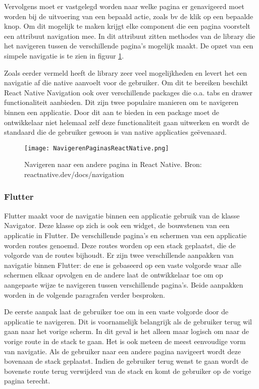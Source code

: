 Vervolgens moet er vastgelegd worden naar welke pagina er genavigeerd moet worden bij de uitvoering van een bepaald actie, zoals bv de klik op een bepaalde knop. Om dit mogelijk te maken krijgt elke component die een pagina voorstelt een attribuut navigation mee. In dit attribuut zitten methodes van de library die het navigeren tussen de verschillende pagina's mogelijk maakt. De opzet van een simpele navigatie is te zien in figuur \ref{fig:navigerenReactNative}. 

Zoals eerder vermeld heeft de library zeer veel mogelijkheden en levert het een navigatie af die native aanvoelt voor de gebruiker. Om dit te bereiken beschikt React Native Navigation ook over verschillende packages die o.a. tabs en drawer functionaliteit aanbieden. Dit zijn twee populaire manieren om te navigeren binnen een applicatie. Door dit aan te bieden in een package moet de ontwikkelaar niet helemaal zelf deze functionaliteit gaan uitwerken en wordt de standaard die de gebruiker gewoon is van native applicaties geëvenaard.

\begin{figure}
    \texttt{[image: NavigerenPaginasReactNative.png]}
    \caption{Navigeren naar een andere pagina in React Native. Bron: reactnative.dev/docs/navigation}
    \label{fig:navigerenReactNative}
\end{figure}

\subsubsection{Flutter}
\label{subsubsec:navigatieFlutter}

Flutter maakt voor de navigatie binnen een applicatie gebruik van de klasse Navigator. Deze klasse op zich is ook een widget, de bouwstenen van een applicatie in Flutter. De verschillende pagina's en schermen van een applicatie worden routes genoemd. Deze routes worden op een stack geplaatst, die de volgorde van de routes bijhoudt. Er zijn twee verschillende aanpakken van navigatie binnen Flutter: de ene is gebaseerd op een vaste volgorde waar alle schermen elkaar opvolgen en de andere laat de ontwikkelaar toe om op aangepaste wijze te navigeren tussen verschillende pagina's. Beide aanpakken worden in de volgende paragrafen verder besproken. 

De eerste aanpak laat de gebruiker toe om in een vaste volgorde door de applicatie te navigeren. Dit is voornamelijk belangrijk als de gebruiker terug wil gaan naar het vorige scherm. In dit geval is het alleen maar logisch om naar de vorige route in de stack te gaan. Het is ook meteen de meest eenvoudige vorm van navigatie. Als de gebruiker naar een andere pagina navigeert wordt deze bovenaan de stack geplaatst. Indien de gebruiker terug wenst te gaan wordt de bovenste route terug verwijderd van de stack en komt de gebruiker op de vorige pagina terecht.

